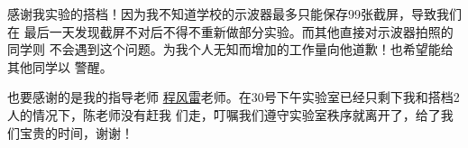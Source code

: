 \documentclass[../main]{subfiles}
\begin{document}
\begin{acknowledgement}
  感谢我实验的搭档！因为我不知道学校的示波器最多只能保存99张截屏，导致我们在
  最后一天发现截屏不对后不得不重新做部分实验。而其他直接对示波器拍照的同学则
  不会遇到这个问题。为我个人无知而增加的工作量向他道歉！也希望能给其他同学以
  警醒。

  也要感谢的是我的指导老师
  \href{http://www.xuerentang.net/teacher.php?tname=%E7%A8%8B%E9%A3%8E%E9%9B%B7&sname=%E5%8D%97%E4%BA%AC%E7%90%86%E5%B7%A5%E5%A4%A7%E5%AD%A6}{%
  程风雷}老师。在30号下午实验室已经只剩下我和搭档2人的情况下，陈老师没有赶我
  们走，叮嘱我们遵守实验室秩序就离开了，给了我们宝贵的时间，谢谢！
\end{acknowledgement}
\end{document}
